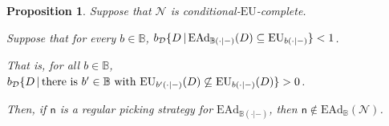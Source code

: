 \documentclass[a4paper]{article}
\newtheorem{proposition}[theorem]{Proposition}
\renewcommand\P{\mathbb{P}} %
\newcommand\EU{\mathrm{EU}}
\newcommand\EAd{\mathrm{EAd}}
\newcommand{\D}{\mathcal{D}}
\renewcommand\c{\mathsf{c}} %
\newcommand{\n}{\mathsf{n}}
\newcommand\Nu{\mathcal{N}}
\newcommand{\IB}{\mathbb{B}}
\newcommand{\IP}{\P}
\newcommand{\todoold}[2][]{\todo[backgroundcolor=white,bordercolor=orange!10,linecolor=gray!10, #1,caption={},textcolor=gray]{Pre-rev: #2}}
\newcommand{\todooldinfo}[2][]{\todoold[#1]{#2}}
\newcommand\SetDelimiter[1][]{
	\nonscript\,#1\vert \allowbreak \nonscript\,\mathopen{}}
\providecommand\given{\SetDelimiter}
\newenvironment{CCM rewritten}
{\begingroup\color{blue}} %
{\endgroup}              %
\begin{document}

	\begin{proposition}\label{thm:ead-nu-reg-nec}
		Suppose that $\Nu$ is conditional-$\EU$-complete.
		
Suppose that for every $b\in\IB$, $b_\D\{D\given \EAd_{\IB(\cdot|-)}(D)\subseteq\EU_{b(\cdot|-)}\}<1$. 

That is, for all $b\in \IB$, $b_\D\{D\given \text{there is $b'\in\IB$ with }\EU_{b'(\cdot|-)}(D)\not\subseteq\EU_{b(\cdot|-)}(D)\}>0$. 
		
		
	Then, if $\n$ is a regular picking strategy for $\EAd_{\IB(\cdot|-)}$, then $\n\notin \EAd_\IB(\Nu)$.
	\end{proposition}
	





\end{document}
